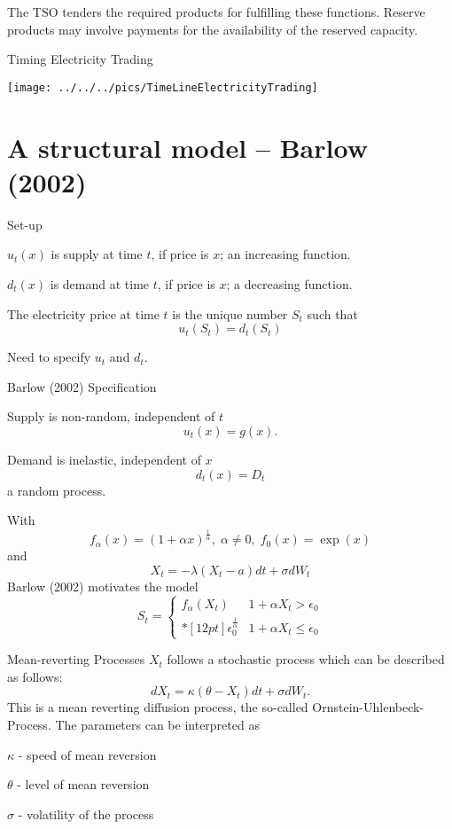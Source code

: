 

The TSO tenders the required products for fulfilling these functions. Reserve products may involve payments for the availability of the reserved capacity.

{Timing Electricity Trading}
\begin{center}
\texttt{[image: ../../../pics/TimeLineElectricityTrading]}
\end{center}

\section{A structural model -- Barlow (2002)}

{Set-up}






	$u_t(x)$ is supply at time $t$, if price is $x$; an increasing function.


	$d_t(x)$ is demand at time $t$, if price is $x$; a decreasing function.


	The electricity price at time $t$ is the unique number $S_t$ such that
$$
u_t(S_t)=d_t(S_t)
$$


	Need to specify $u_t$ and $d_t$.





{Barlow (2002) Specification}






	Supply is non-random, independent of $t$
$$u_t(x)=g(x).$$


	Demand is inelastic, independent of $x$
$$d_t(x)=D_t$$
a random process.


	With
$$
f_\alpha(x) = (1+\alpha x)^\frac{1}{\alpha}, \;\alpha \not=0, \; f_0(x)=\exp(x)
$$
and
$$
X_t= -\lambda (X_t-a)dt +\sigma dW_t
$$
Barlow (2002) motivates the model
$$
S_t= \left \{ \begin{array}{ll}
\displaystyle
f_\alpha(X_t) & 1+\alpha  X_t> \epsilon_0 \\*[12pt]
\epsilon_0^\frac{1}{\alpha} & 1+\alpha X_t \leq \epsilon_0
\end{array}
\right.
$$






{Mean-reverting Processes}
$X_t$ follows a stochastic process which can be described as follows:
$$
dX_t= \kappa \left( \theta -X_t \right) dt + \sigma dW_t.
$$
This is  a mean reverting diffusion process, the so-called Ornstein-Uhlenbeck-Process.
The parameters can be interpreted as






	$\kappa$ - speed of mean reversion


	$\theta$ - level of mean reversion


	$\sigma$ - volatility of the process





